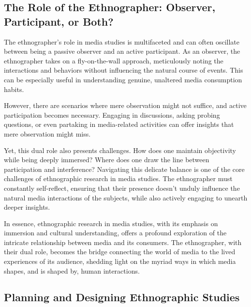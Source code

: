 \documentclass[
  b5paper]{book}
\begin{document}
\hypertarget{the-role-of-the-ethnographer-observer-participant-or-both}{%
\subsection*{The Role of the Ethnographer: Observer, Participant, or Both?}\label{the-role-of-the-ethnographer-observer-participant-or-both}}

The ethnographer's role in media studies is multifaceted and can often oscillate between being a passive observer and an active participant. As an observer, the ethnographer takes on a fly-on-the-wall approach, meticulously noting the interactions and behaviors without influencing the natural course of events. This can be especially useful in understanding genuine, unaltered media consumption habits.

However, there are scenarios where mere observation might not suffice, and active participation becomes necessary. Engaging in discussions, asking probing questions, or even partaking in media-related activities can offer insights that mere observation might miss.

Yet, this dual role also presents challenges. How does one maintain objectivity while being deeply immersed? Where does one draw the line between participation and interference? Navigating this delicate balance is one of the core challenges of ethnographic research in media studies. The ethnographer must constantly self-reflect, ensuring that their presence doesn't unduly influence the natural media interactions of the subjects, while also actively engaging to unearth deeper insights.

In essence, ethnographic research in media studies, with its emphasis on immersion and cultural understanding, offers a profound exploration of the intricate relationship between media and its consumers. The ethnographer, with their dual role, becomes the bridge connecting the world of media to the lived experiences of its audience, shedding light on the myriad ways in which media shapes, and is shaped by, human interactions.

\hypertarget{planning-and-designing-ethnographic-studies}{%
\subsection*{Planning and Designing Ethnographic Studies}\label{planning-and-designing-ethnographic-studies}}
\end{document}
